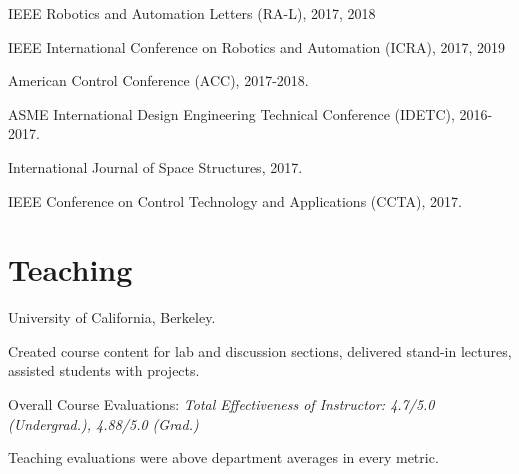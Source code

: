 \documentclass[letterpaper]{deedy-resume} %
\begin{document}
{\begin{tightitemize}
\item IEEE Robotics and Automation Letters (RA-L), 2017, 2018
  
\item IEEE International Conference on Robotics and Automation (ICRA), 2017, 2019

\item American Control Conference (ACC), 2017-2018.

\item ASME International Design Engineering Technical Conference (IDETC), 2016-2017.

\item International Journal of Space Structures, 2017.

\item IEEE Conference on Control Technology and Applications (CCTA), 2017.

\end{tightitemize}


\section{Teaching}

\vspace{0.2cm}


{{} University of California, Berkeley.
  
\begin{tightitemize}
\item Created course content for lab and discussion sections, delivered stand-in lectures, assisted students with projects.
\item Overall Course Evaluations: {\it Total Effectiveness of Instructor: 4.7/5.0 (Undergrad.), 4.88/5.0 (Grad.)}
\item Teaching evaluations were above department averages in every metric.
\end{tightitemize}}

\vspace{0.2cm}



}
\end{document}

